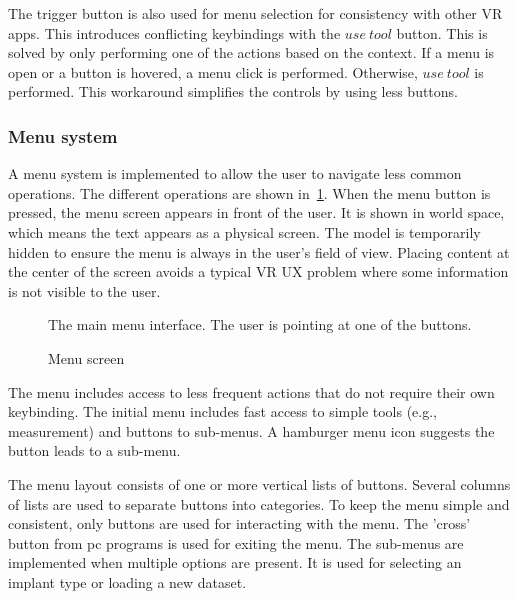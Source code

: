 \documentclass[a4paper]{report}
\begin{document}
The trigger button is also used for menu selection for consistency with other VR apps. This introduces conflicting keybindings with the $use\ tool$ button. This is solved by only performing one of the actions based on the context. If a menu is open or a button is hovered, a menu click is performed. Otherwise, $use\ tool$ is performed. This workaround simplifies the controls by using less buttons.

\subsubsection{Menu system}
A menu system is implemented to allow the user to navigate less common operations. The different operations are shown in~\ref{menu}.
When the menu button is pressed, the menu screen appears in front of the user. It is shown in world space, which means the text appears as a physical screen. The model is temporarily hidden to ensure the menu is always in the user's field of view. Placing content at the center of the screen avoids a typical VR UX problem where some information is not visible to the user.

\begin{figure}[h!]
    \centering
	\hfill
	\caption{Menu screen}\label{menu}
  \small
  The main menu interface. The user is pointing at one of the buttons.
\end{figure}

The menu includes access to less frequent actions that do not require their own keybinding. The initial menu includes fast access to simple tools (e.g., measurement) and buttons to sub-menus. A hamburger menu icon suggests the button leads to a sub-menu.

The menu layout consists of one or more vertical lists of buttons. Several columns of lists are used to separate buttons into categories. To keep the menu simple and consistent, only buttons are used for interacting with the menu. The 'cross' button from pc programs is used for exiting the menu.
The sub-menus are implemented when multiple options are present. It is used for selecting an implant type or loading a new dataset.
\end{document}
